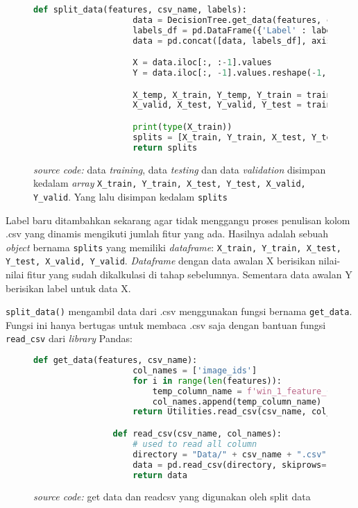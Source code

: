		\begin{figure}[H]
			\begin{lstlisting}[language=Python, basicstyle=\tiny]
				def split_data(features, csv_name, labels):
					data = DecisionTree.get_data(features, csv_name)
					labels_df = pd.DataFrame({'Label' : labels})
					data = pd.concat([data, labels_df], axis=1)

					X = data.iloc[:, :-1].values 
					Y = data.iloc[:, -1].values.reshape(-1, 1)

					X_temp, X_train, Y_temp, Y_train = train_test_split(X, Y, test_size=0.3, random_state=42)
					X_valid, X_test, Y_valid, Y_test = train_test_split(X_temp, Y_temp, test_size=0.5, random_state=42)

					print(type(X_train))
					splits = [X_train, Y_train, X_test, Y_test, X_valid, Y_valid]
					return splits
			\end{lstlisting}
			\caption{\emph{source code:} data \emph{training}, data \emph{testing} dan data \emph{validation} 
			disimpan kedalam \textit{array} \texttt{X\_train, Y\_train, X\_test, Y\_test, X\_valid, Y\_valid}. 
			Yang lalu disimpan kedalam \texttt{splits}}
			\label{code: spliting dataset}
		\end{figure}

		Label baru ditambahkan sekarang agar tidak menggangu proses penulisan kolom .csv yang dinamis 
		mengikuti jumlah fitur yang ada. Hasilnya adalah sebuah \textit{object} bernama \texttt{splits} 
		yang memiliki \textit{dataframe}: \texttt{X\_train, Y\_train, X\_test, Y\_test, X\_valid, Y\_valid}. \textit{Dataframe} 
		dengan data awalan X berisikan nilai-nilai fitur yang sudah dikalkulasi di tahap sebelumnya. 
		Sementara data awalan Y berisikan label untuk data X.

		\texttt{split\_data()} mengambil data dari .csv menggunakan fungsi bernama \texttt{get\_data}. Fungsi ini 
		hanya bertugas untuk membaca .csv saja dengan bantuan fungsi \texttt{read\_csv} dari \textit{library} Pandas:
		
		\begin{figure}[H]
			\begin{lstlisting}[language=Python, basicstyle=\tiny]
				def get_data(features, csv_name):
					col_names = ['image_ids']
					for i in range(len(features)):
						temp_column_name = f'win_1_feature_{i}'
						col_names.append(temp_column_name)
					return Utilities.read_csv(csv_name, col_names)

				def read_csv(csv_name, col_names):
					# used to read all column
					directory = "Data/" + csv_name + ".csv"
					data = pd.read_csv(directory, skiprows=1, header=None, names = col_names)
					return data
			\end{lstlisting}
			\caption{\emph{source code:} get data dan readcsv yang digunakan oleh split data}
			\label{code: get data and read csv}
		\end{figure}

